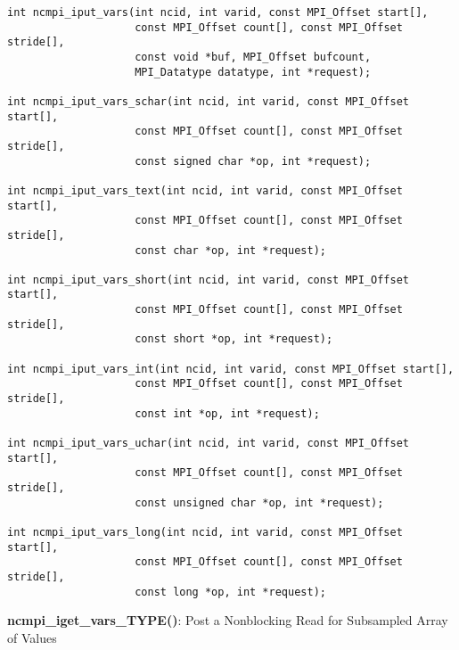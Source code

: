 \begin{verbatim}
int ncmpi_iput_vars(int ncid, int varid, const MPI_Offset start[],
                    const MPI_Offset count[], const MPI_Offset stride[],
                    const void *buf, MPI_Offset bufcount,
                    MPI_Datatype datatype, int *request);

int ncmpi_iput_vars_schar(int ncid, int varid, const MPI_Offset start[],
                    const MPI_Offset count[], const MPI_Offset stride[],
                    const signed char *op, int *request);

int ncmpi_iput_vars_text(int ncid, int varid, const MPI_Offset start[],
                    const MPI_Offset count[], const MPI_Offset stride[],
                    const char *op, int *request);

int ncmpi_iput_vars_short(int ncid, int varid, const MPI_Offset start[],
                    const MPI_Offset count[], const MPI_Offset stride[],
                    const short *op, int *request);

int ncmpi_iput_vars_int(int ncid, int varid, const MPI_Offset start[],
                    const MPI_Offset count[], const MPI_Offset stride[],
                    const int *op, int *request);

int ncmpi_iput_vars_uchar(int ncid, int varid, const MPI_Offset start[],
                    const MPI_Offset count[], const MPI_Offset stride[],
                    const unsigned char *op, int *request);

int ncmpi_iput_vars_long(int ncid, int varid, const MPI_Offset start[],
                    const MPI_Offset count[], const MPI_Offset stride[],
                    const long *op, int *request);
\end{verbatim}


{\bf ncmpi\_iget\_vars\_TYPE()}: Post a Nonblocking Read for Subsampled Array of Values

